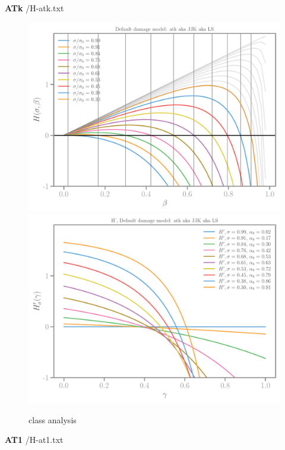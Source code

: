 \documentclass[]{article}
\begin{document}
\textbf{ATk}
{/H-atk.txt}
\begin{figure}[htbp]
  \includegraphics[width=.33\textheight]{../figures/atk-Hbeta.pdf}
  \includegraphics[width=.33\textheight]{../figures/atk-H-prime-beta.pdf}
  \caption{class analysis}
  \label{fig:class-analyser}
\end{figure}
\textbf{AT1}
{/H-at1.txt}
\end{document}
